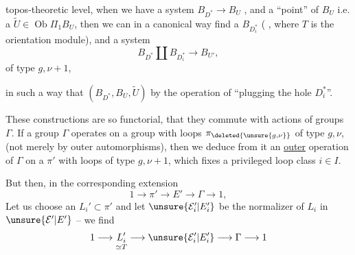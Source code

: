   topos-theoretic level, when we have a system \(B_{D^*}\longrightarrow B_U\) , and a ``point'' of \(B_U\) i.e. a \(\widetilde U\in\operatorname{Ob}\Pi_1B_U\), then we can in a canonical way find a \(B_{D_i^*}\) ( , where \(T\) is the orientation module), and a system
\[
B_{D^*}\amalg B_{D_i^*}\longrightarrow B_{U'},
\]
of type \(g,\nu+1\),


in such a way that \((B_{D^*},B_U,\widetilde U)\)  by the operation of ``plugging the hole \(D_i^*\)''.

These constructions are so functorial, \margin{\unsure{\(\wedge\)}} that they commute with actions of groups \(\Gamma\). If a group \(\Gamma\) operates on a group with loops \(\pi_{\deleted{\unsure{g,\nu}}}\) of type \(g,\nu\), (not merely by outer automorphisms), then we deduce from it an \uline{outer} operation of \(\Gamma\) on a \(\pi'\) with loops of type \(g,\nu+1\), which fixes a privileged loop class \(i\in I\).

But then, in the corresponding extension
\[
1\longrightarrow\pi'\longrightarrow E'\longrightarrow\Gamma\longrightarrow1,
\]
Let us choose an \(L_i'\subset\pi'\) and let \(\unsure{\mathcal E_i'|E_i'}\) be the normalizer of \(L_i\) in \(\unsure{\mathcal E'|E'}\) -- we find
\[
1\longrightarrow
\underset{\simeq T}{L_i'}
\longrightarrow\unsure{\mathcal E_i'|E_i'}
\longrightarrow\Gamma\longrightarrow1
\]